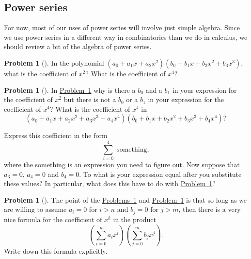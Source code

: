 \documentclass[10pt,]{book}
\theoremstyle{plain}
\theoremstyle{definition}
\newtheorem{activity}[project]{Problem}
\theoremstyle{definition}
\numberwithin{equation}{chapter}
\begin{document}
\subsection[{Power series}]{Power series}\label{subsection-43}
For now, most of our uses of power series will involve just simple algebra. Since we use power series in a different way in combinatorics than we do in calculus, we should review a bit of the algebra of power series.%
\begin{activity}[] \label{coeffinproduct}
In the polynomial \((a_0 +a_1x+a_2x^2)(b_0+b_1x+b_2x^2+b_3x^3)\), what is the coefficient of \(x^2\)? What is the coefficient of \(x^4\)?%
\end{activity}
\begin{activity}[] \label{coeffinproduct1}
In \hyperref[coeffinproduct]{Problem~\ref{coeffinproduct}} why is there a \(b_0\) and a \(b_1\) in your expression for the coefficient of \(x^2\) but there is not a \(b_0\) or a \(b_1\) in your expression for the coefficient of \(x^4\)? What is the coefficient of \(x^4\) in%
\begin{equation*}
(a_0+a_1x+a_2x^2+a_3x^3+a_4x^4)(b_0+b_1x+b_2x^2
+b_3x^3+b_4x^4)?
\end{equation*}
%
\par
Express this coefficient in the form%
\begin{equation*}
\sum_{i=0}^4 \mbox{ something} ,
\end{equation*}
where the something is an expression you need to figure out. Now suppose that \(a_3=0\), \(a_4=0\) and \(b_4=0\). To what is your expression equal after you substitute these values? In particular, what does this have to do with \hyperref[coeffinproduct]{Problem~\ref{coeffinproduct}}?%
\end{activity}
\begin{activity}[] \label{coeffinproduct2}
The point of the \hyperref[coeffinproduct]{Problems~\ref{coeffinproduct}} and \hyperref[coeffinproduct1]{Problem~\ref{coeffinproduct1}} is that so long as we are willing to assume \(a_i=0\) for \(i>n\) and \(b_j =0\) for \(j>m\), then there is a very nice formula for the coefficient of \(x^k\) in the product%
\begin{equation*}
\left(\sum_{i=0}^n a_ix^i\right)\left(\sum_{j=0}^m b_jx^j\right).
\end{equation*}
Write down this formula explicitly.%
\end{activity}
\end{document}
